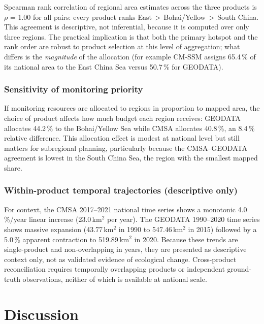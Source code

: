 \documentclass[11pt]{article}
\begin{document}
Spearman rank correlation of regional area estimates across the three products
is $\rho$ = 1.00 for all pairs: every product ranks
East\,$>$\,Bohai/Yellow\,$>$\,South China. This agreement is descriptive, not
inferential, because it is computed over only three regions. The practical
implication is that both the primary hotspot and the rank order are robust to
product selection at this level of aggregation; what differs is the
\emph{magnitude} of the allocation (for example CM-SSM assigns 65.4\,\% of its
national area to the East China Sea versus 50.7\,\% for GEODATA).

\subsubsection{Sensitivity of monitoring priority}

If monitoring resources are allocated to regions in proportion to mapped
area, the choice of product affects how much budget each region receives:
GEODATA allocates 44.2\,\% to the Bohai/Yellow Sea while CMSA allocates
40.8\,\%, an 8.4\,\% relative difference. This allocation effect is modest
at national level but still matters for subregional
planning, particularly because the CMSA--GEODATA agreement is lowest in the
South China Sea, the region with the smallest mapped share.

\subsubsection{Within-product temporal trajectories (descriptive only)}

For context, the CMSA 2017--2021 national time series shows a monotonic
4.0\,\%/year linear increase (23.0\,km$^2$ per year). The
GEODATA 1990--2020 time series shows massive expansion (43.77\,km$^2$ in 1990
to 547.46\,km$^2$ in 2015) followed by a 5.0\,\% apparent contraction to
519.89\,km$^2$ in 2020. Because these trends are single-product and
non-overlapping in years, they are presented as descriptive context only, not
as validated evidence of ecological change. Cross-product reconciliation
requires temporally overlapping products or independent ground-truth
observations, neither of which is available at national scale.

\section{Discussion}
\label{sec:discussion}
\end{document}
